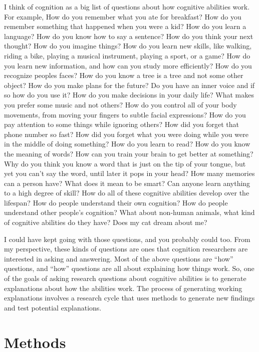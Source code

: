 \documentclass[
  oneside,
  12pt]{crumpbook}
\begin{document}
I think of cognition as a big list of questions about how cognitive abilities work. For example, How do you remember what you ate for breakfast? How do you remember something that happened when you were a kid? How do you learn a language? How do you know how to say a sentence? How do you think your next thought? How do you imagine things? How do you learn new skills, like walking, riding a bike, playing a musical instrument, playing a sport, or a game? How do you learn new information, and how can you study more efficiently? How do you recognize peoples faces? How do you know a tree is a tree and not some other object? How do you make plans for the future? Do you have an inner voice and if so how do you use it? How do you make decisions in your daily life? What makes you prefer some music and not others? How do you control all of your body movements, from moving your fingers to subtle facial expressions? How do you pay attention to some things while ignoring others? How did you forget that phone number so fast? How did you forget what you were doing while you were in the middle of doing something? How do you learn to read? How do you know the meaning of words? How can you train your brain to get better at something? Why do you think you know a word that is just on the tip of your tongue, but yet you can't say the word, until later it pops in your head? How many memories can a person have? What does it mean to be smart? Can anyone learn anything to a high degree of skill? How do all of these cognitive abilities develop over the lifespan? How do people understand their own cognition? How do people understand other people's cognition? What about non-human animals, what kind of cognitive abilities do they have? Does my cat dream about me?

I could have kept going with those questions, and you probably could too. From my perspective, these kinds of questions are ones that cognition researchers are interested in asking and answering. Most of the above questions are ``how'' questions, and ``how'' questions are all about explaining how things work. So, one of the goals of asking research questions about cognitive abilities is to generate explanations about how the abilities work. The process of generating working explanations involves a research cycle that uses methods to generate new findings and test potential explanations.

\hypertarget{methods}{%
\section{Methods}\label{methods}}
\end{document}
